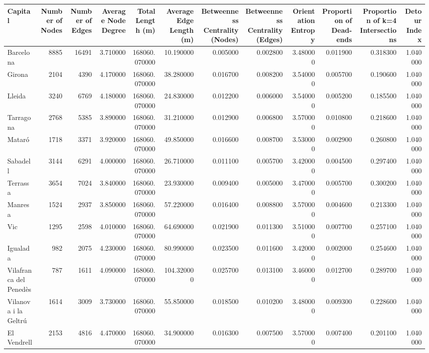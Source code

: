 \documentclass{article}
\begin{document}
\begin{table}[ht]
\centering
\begin{tabular}{lrrrrrrrrrrr}
\toprule
Capital & Number of Nodes & Number of Edges & Average Node Degree & Total Length (m) & Average Edge Length (m) & Betweenness Centrality (Nodes) & Betweenness Centrality (Edges) & Orientation Entropy & Proportion of Dead-ends & Proportion of k=4 Intersections & Detour Index \\
\midrule
Barcelona & 8885 & 16491 & 3.710000 & 168060.070000 & 10.190000 & 0.005000 & 0.002800 & 3.480000 & 0.011900 & 0.318300 & 1.040000 \\
Girona & 2104 & 4390 & 4.170000 & 168060.070000 & 38.280000 & 0.016700 & 0.008200 & 3.540000 & 0.005700 & 0.190600 & 1.040000 \\
Lleida & 3240 & 6769 & 4.180000 & 168060.070000 & 24.830000 & 0.012200 & 0.006000 & 3.540000 & 0.005200 & 0.185500 & 1.040000 \\
Tarragona & 2768 & 5385 & 3.890000 & 168060.070000 & 31.210000 & 0.012900 & 0.006800 & 3.570000 & 0.010800 & 0.218600 & 1.040000 \\
Mataró & 1718 & 3371 & 3.920000 & 168060.070000 & 49.850000 & 0.016600 & 0.008700 & 3.530000 & 0.002900 & 0.260800 & 1.040000 \\
Sabadell & 3144 & 6291 & 4.000000 & 168060.070000 & 26.710000 & 0.011100 & 0.005700 & 3.420000 & 0.004500 & 0.297400 & 1.040000 \\
Terrassa & 3654 & 7024 & 3.840000 & 168060.070000 & 23.930000 & 0.009400 & 0.005000 & 3.470000 & 0.005700 & 0.300200 & 1.040000 \\
Manresa & 1524 & 2937 & 3.850000 & 168060.070000 & 57.220000 & 0.016400 & 0.008800 & 3.570000 & 0.004600 & 0.213300 & 1.040000 \\
Vic & 1295 & 2598 & 4.010000 & 168060.070000 & 64.690000 & 0.021900 & 0.011300 & 3.510000 & 0.007700 & 0.257100 & 1.040000 \\
Igualada & 982 & 2075 & 4.230000 & 168060.070000 & 80.990000 & 0.023500 & 0.011600 & 3.420000 & 0.002000 & 0.254600 & 1.040000 \\
Vilafranca del Penedès & 787 & 1611 & 4.090000 & 168060.070000 & 104.320000 & 0.025700 & 0.013100 & 3.460000 & 0.012700 & 0.289700 & 1.040000 \\
Vilanova i la Geltrú & 1614 & 3009 & 3.730000 & 168060.070000 & 55.850000 & 0.018500 & 0.010200 & 3.480000 & 0.009300 & 0.228600 & 1.040000 \\
El Vendrell & 2153 & 4816 & 4.470000 & 168060.070000 & 34.900000 & 0.016300 & 0.007500 & 3.570000 & 0.007400 & 0.201100 & 1.040000 \\

\end{tabular}
\end{table}
\end{document}
